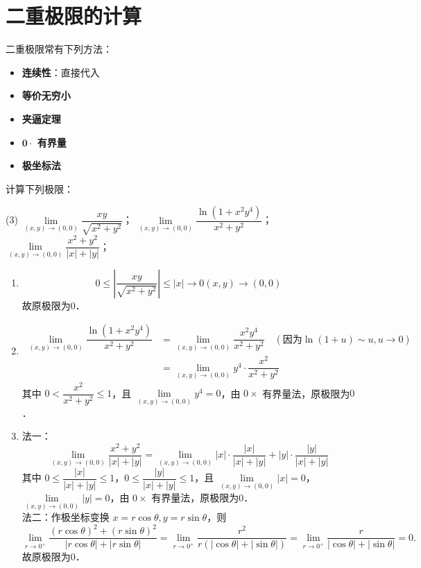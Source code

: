 \documentclass[12pt, a4paper, oneside, UTF8]{ctexbook}
\begin{document}
\section{二重极限的计算}
\begin{theorem}
    二重极限常有下列方法：
    \begin{itemize}
        \item \textbf{连续性}：直接代入
        \item \textbf{等价无穷小}
        \item \textbf{夹逼定理}
        \item \textbf{$\bm{0\cdot}$ 有界量}
        \item \textbf{极坐标法}
    \end{itemize}
\end{theorem}
\begin{example}
    计算下列极限：
    \begin{tasks}[label=(\arabic*)](3)
        \task $\lim\limits_{(x,y) \to (0,0)} \dfrac{xy}{\sqrt{x^2+y^2}}$；
        \task $\lim\limits_{(x,y) \to (0,0)} \dfrac{\ln(1+x^2y^4)}{x^2+y^2}$；
        \task $\lim\limits_{(x,y) \to (0,0)} \dfrac{x^2 +y^2}{|x| + |y|}$；
    \end{tasks}
\end{example}
\begin{solution}
    \begin{enumerate}[label=(\arabic*)]
        \item \[0\leq\left| \dfrac{xy}{\sqrt{x^2+y^2}} \right| \leq |x| \to 0 (x,y) \to (0,0)\]
        故原极限为$\boxed{0}$．
        \item \begin{align*}
            \lim\limits_{(x,y) \to (0,0)} \dfrac{\ln(1+x^2y^4)}{x^2+y^2} & = \lim\limits_{(x,y) \to (0,0)} \dfrac{x^2y^4}{x^2+y^2} \quad (\text{因为} \ln(1+u) \sim u, u \to 0) \\
            & = \lim\limits_{(x,y) \to (0,0)} y^4 \cdot \dfrac{x^2}{x^2+y^2} 
        \end{align*}
        其中 $0 < \dfrac{x^2}{x^2+y^2} \leq 1$，且 $\lim\limits_{(x,y) \to (0,0)} y^4 = 0$，由 $0 \times$ 有界量法，原极限为$\boxed{0}$．\\
        \item 法一：
        \[ \lim\limits_{(x,y) \to (0,0)} \dfrac{x^2 +y^2}{|x| + |y|}= \lim\limits_{(x,y) \to (0,0)} |x| \cdot \dfrac{|x|}{|x| + |y|} + |y| \cdot \dfrac{|y|}{|x| + |y|} \]
        其中 $0 \leq \dfrac{|x|}{|x| + |y|} \leq 1$，$0 \leq \dfrac{|y|}{|x| + |y|} \leq 1$，且 $\lim\limits_{(x,y) \to (0,0)} |x| = 0$，$\lim\limits_{(x,y) \to (0,0)} |y| = 0$，由 $0 \times$ 有界量法，原极限为$\boxed{0}$．\\
        法二：作极坐标变换 $x=r\cos\theta, y=r\sin\theta$，则
        \[ \lim_{r \to 0^+} \dfrac{(r\cos\theta)^2 +(r\sin\theta)^2}{|r\cos\theta| + |r\sin\theta|} = \lim_{r \to 0^+} \dfrac{r^2}{r(|\cos\theta| + |\sin\theta|)} = \lim_{r \to 0^+} \dfrac{r}{|\cos\theta| + |\sin\theta|} = 0. \]
        故原极限为$\boxed{0}$．
    \end{enumerate}
\end{solution}
\end{document}

